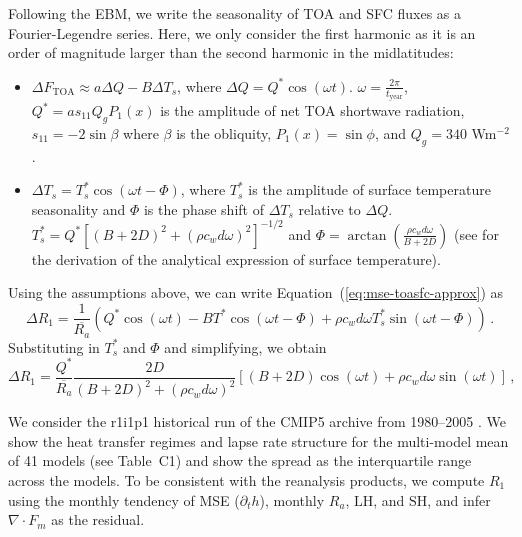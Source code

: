 \documentclass{ametsocV5}
\begin{document}
\appendix[B]
Following the \cite{rose2017} EBM, we write the seasonality of TOA and SFC fluxes as a Fourier-Legendre series. Here, we only consider the first harmonic as it is an order of magnitude larger than the second harmonic in the midlatitudes:
    \begin{itemize}
      \item $\Delta F_{\mathrm{TOA}} \approx a\Delta Q - B\Delta T_{s}$, where $\Delta Q = Q^{*}\cos(\omega t)$. $\omega=\frac{2\pi}{t_{\mathrm{year}}}$, $Q^{*}=as_{11}Q_{g}P_{1}(x)$ is the amplitude of net TOA shortwave radiation, $s_{11}=-2\sin{\beta}$ where $\beta$ is the obliquity, $P_1(x) = \sin\phi$, and $Q_{g}=340$ Wm$^{-2}$. 
      \item $\Delta T_{s} = T_{s}^{*}\cos(\omega t - \Phi)$, where $T_{s}^{*}$ is the amplitude of surface temperature seasonality and $\Phi$ is the phase shift of $\Delta T_{s}$ relative to $\Delta Q$. $T_{s}^{*}=Q^{*}\left[(B+2D)^{2}+(\rho c_w d \omega)^{2}\right]^{-1/2}$ and $\Phi=\arctan\left(\frac{\rho c_w d \omega}{B+2D}\right)$ (see \cite{rose2017} for the derivation of the analytical expression of surface temperature).
    \end{itemize}
  Using the assumptions above, we can write Equation~(\ref{eq:mse-toasfc-approx}) as
  \begin{equation} \label{eq:r1-linear3}
    \Delta R_{1} = \frac{1}{\overline{R_{a}}}\left(Q^{*}\cos(\omega t) -BT^{*}\cos(\omega t - \Phi)+\rho c_{w} d \omega T_{s}^{*}\sin(\omega t - \Phi) \right) \, .
  \end{equation}
  Substituting in $T_{s}^{*}$ and $\Phi$ and simplifying, we obtain
  \begin{equation} \label{eq:r1-linear4-deriv}
    \Delta R_{1} = \frac{Q^{*}}{\overline{R_{a}}}\frac{2D}{(B+2D)^{2}+(\rho c_w d \omega)^{2}}\left[(B+2D)\cos(\omega t)+\rho c_w d \omega \sin(\omega t)\right] \, ,
  \end{equation}

\appendix[C]
We consider the r1i1p1 historical run of the CMIP5 archive from 1980--2005 \citep{taylor2012}. We show the heat transfer regimes and lapse rate structure for the multi-model mean of 41 models (see Table~C1) and show the spread as the interquartile range across the models. To be consistent with the reanalysis products, we compute $R_1$ using the monthly tendency of MSE ($\partial_t h$), monthly $R_a$, $\mathrm{LH}$, and $\mathrm{SH}$, and infer $\nabla\cdot F_m $ as the residual.
\end{document}
